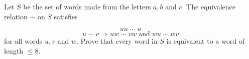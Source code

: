 Let $S$ be the set of words made from the letters $a,b$ and $c$. The equivalence relation $\sim$ on $S$ satisfies

\[uu \sim u \]\[u \sim v \Rightarrow uw \sim vw \; \text{and} \; wu \sim wv\]
for all words $u, v$ and $w$. Prove that every word in $S$ is equivalent to a word of length $\leq 8$.
